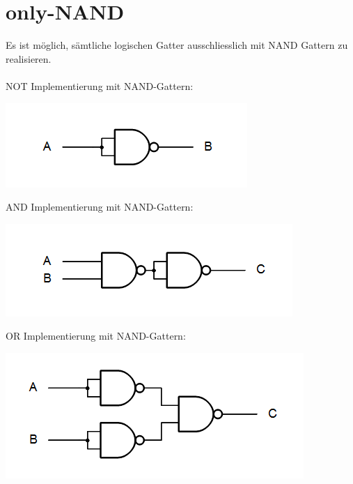 \documentclass[a4paper,10pt]{report}
\begin{document}
\section{only-NAND}
Es ist möglich, sämtliche logischen Gatter ausschliesslich mit NAND Gattern zu realisieren. \\ \\
NOT Implementierung mit NAND-Gattern:
\begin{center}
\includegraphics[scale=0.5]{imgs/NAND_NOT.png}
\end{center} 
AND Implementierung mit NAND-Gattern:
\begin{center}
\includegraphics[scale=0.5]{imgs/NAND_AND.png}
\end{center} 
OR Implementierung mit NAND-Gattern:
\begin{center}
\includegraphics[scale=0.5]{imgs/NAND_OR.png}
\end{center} 
\end{document}
